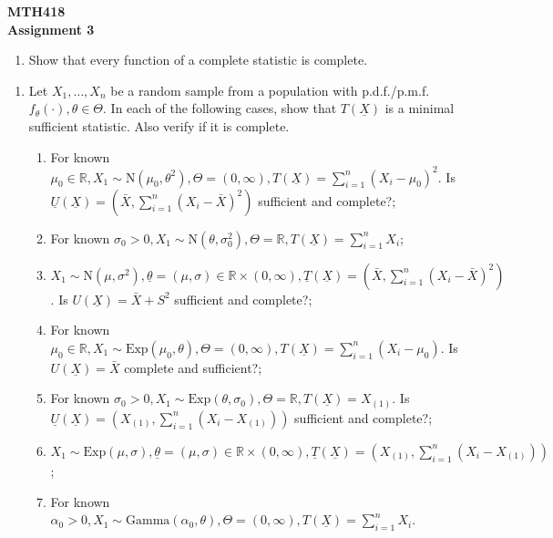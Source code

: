 \documentclass[11pt]{article}
\begin{document}
\begin{center}
    \textbf{MTH418} \\
    \textbf{Assignment 3}
\end{center}

\begin{enumerate}
    \item [1.] Show that every function of a complete statistic is complete.
\end{enumerate}

\begin{enumerate}
    \item [2.] Let $X_1, \ldots, X_n$ be a random sample from a population with p.d.f./p.m.f. $f_\theta(\cdot), \theta \in \Theta$. In each of the following cases, show that $T(\underline{X})$ is a minimal sufficient statistic. Also verify if it is complete.

    \begin{enumerate}
        \item[(a)] For known $\mu_0 \in \mathbb{R}, X_1 \sim \mathrm{N}(\mu_0, \theta^2), \Theta = (0, \infty), T(\underline{X}) = \sum_{i=1}^n (X_i - \mu_0)^2$. Is $\underline{U}(\underline{X}) = \left(\bar{X}, \sum_{i=1}^n (X_i - \bar{X})^2\right)$ sufficient and complete?;
        \item[(b)] For known $\sigma_0 > 0, X_1 \sim \mathrm{N}(\theta, \sigma_0^2), \Theta = \mathbb{R}, T(\underline{X}) = \sum_{i=1}^n X_i$;
        \item[(c)] $X_1 \sim \mathrm{N}(\mu, \sigma^2), \underline{\theta} = (\mu, \sigma) \in \mathbb{R} \times (0, \infty), \underline{T}(\underline{X}) = \left(\bar{X}, \sum_{i=1}^n (X_i - \bar{X})^2\right)$. Is $U(\underline{X}) = \bar{X} + S^2$ sufficient and complete?;
        \item[(d)] For known $\mu_0 \in \mathbb{R}, X_1 \sim \mathrm{Exp}(\mu_0, \theta), \Theta = (0, \infty), T(\underline{X}) = \sum_{i=1}^n (X_i - \mu_0)$. Is $U(\underline{X}) = \bar{X}$ complete and sufficient?;
        \item[(e)] For known $\sigma_0 > 0, X_1 \sim \mathrm{Exp}(\theta, \sigma_0), \Theta = \mathbb{R}, T(\underline{X}) = X_{(1)}$. Is $\underline{U}(\underline{X}) = \left(X_{(1)}, \sum_{i=1}^n (X_i - X_{(1)})\right)$ sufficient and complete?;
        \item[(f)] $X_1 \sim \mathrm{Exp}(\mu, \sigma), \underline{\theta} = (\mu, \sigma) \in \mathbb{R} \times (0, \infty), \underline{T}(\underline{X}) = \left(X_{(1)}, \sum_{i=1}^n (X_i - X_{(1)})\right)$;
        \item[(g)] For known $\alpha_0 > 0, X_1 \sim \mathrm{Gamma}(\alpha_0, \theta), \Theta = (0, \infty), T(\underline{X}) = \sum_{i=1}^n X_i$.
    \end{enumerate}

\end{enumerate}
\end{document}
